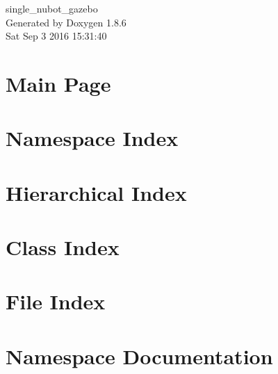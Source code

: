 \documentclass[twoside]{book}
\newcommand{\clearemptydoublepage}{%
  \newpage{\pagestyle{empty}\cleardoublepage}%
}
\begin{document}
\hypersetup{pageanchor=false}
\begin{titlepage}
\vspace*{7cm}
\begin{center}%
{\Large single\-\_\-nubot\-\_\-gazebo }\\
\vspace*{1cm}
{\large Generated by Doxygen 1.8.6}\\
\vspace*{0.5cm}
{\small Sat Sep 3 2016 15:31:40}\\
\end{center}
\end{titlepage}
\clearemptydoublepage
\tableofcontents
\clearemptydoublepage
{}
\hypersetup{pageanchor=true}

\chapter{Main Page}
\label{index}\hypertarget{index}{}
\chapter{Namespace Index}

\chapter{Hierarchical Index}

\chapter{Class Index}

\chapter{File Index}

\chapter{Namespace Documentation}





















\end{document}
